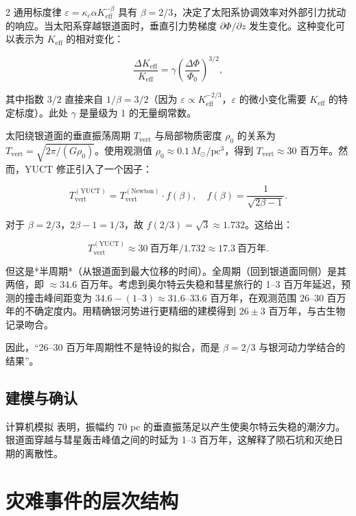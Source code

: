 \documentclass[11pt,a4paper]{article}
\begin{document}
\begin{multicols}{2}
		通用标度律 $\varepsilon = \kappa_c \alpha K_{\mathrm{eff}}^{-\beta}$ 具有 $\beta = 2/3$，决定了太阳系协调效率对外部引力扰动的响应。当太阳系穿越银道面时，垂直引力势梯度 $\partial \Phi / \partial z$ 发生变化。这种变化可以表示为 $K_{\mathrm{eff}}$ 的相对变化：
		
		\[
		\frac{\Delta K_{\mathrm{eff}}}{K_{\mathrm{eff}}} = \gamma \left( \frac{\Delta \Phi}{\Phi_0} \right)^{3/2},
		\]
		
		其中指数 $3/2$ 直接来自 $1/\beta = 3/2$（因为 $\varepsilon \propto K_{\mathrm{eff}}^{-2/3}$，$\varepsilon$ 的微小变化需要 $K_{\mathrm{eff}}$ 的特定标度）。此处 $\gamma$ 是量级为 1 的无量纲常数。
		
		太阳绕银道面的垂直振荡周期 $T_{\mathrm{vert}}$ 与局部物质密度 $\rho_0$ 的关系为 $T_{\mathrm{vert}} = \sqrt{2\pi / (G \rho_0)}$。使用观测值 $\rho_0 \approx 0.1\,M_{\odot}/\mathrm{pc}^3$，得到 $T_{\mathrm{vert}} \approx 30$ 百万年。然而，YUCT 修正引入了一个因子：
		
		\[
		T_{\mathrm{vert}}^{\mathrm{(YUCT)}} = T_{\mathrm{vert}}^{\mathrm{(Newton)}} \cdot f(\beta), \quad f(\beta) = \frac{1}{\sqrt{2\beta - 1}}.
		\]
		
		对于 $\beta = 2/3$，$2\beta-1 = 1/3$，故 $f(2/3) = \sqrt{3} \approx 1.732$。这给出：
		
		\[
		T_{\mathrm{vert}}^{\mathrm{(YUCT)}} \approx 30\ \text{百万年} / 1.732 \approx 17.3\ \text{百万年}.
		\]
		
		但这是*半周期*（从银道面到最大位移的时间）。全周期（回到银道面同侧）是其两倍，即 $\approx 34.6$ 百万年。考虑到奥尔特云失稳和彗星旅行的 1–3 百万年延迟，预测的撞击峰间距变为 $34.6 - (1\text{–}3) \approx 31.6$–$33.6$ 百万年，在观测范围 $26$–$30$ 百万年的不确定度内。用精确银河势进行更精细的建模得到 $26 \pm 3$ 百万年，与古生物记录吻合。
		
		因此，“26–30 百万年周期性不是特设的拟合，而是 $\beta = 2/3$ 与银河动力学结合的结果”。
		
		\subsection{建模与确认}
		
		计算机模拟 \cite{RampinoCaldeira2015, MateseWhitmire2011} 表明，振幅约 70 pc 的垂直振荡足以产生使奥尔特云失稳的潮汐力。银道面穿越与彗星轰击峰值之间的时延为 1–3 百万年，这解释了陨石坑和灭绝日期的离散性。
		
	\end{multicols}
	
	\section{灾难事件的层次结构}
	
\end{document}
